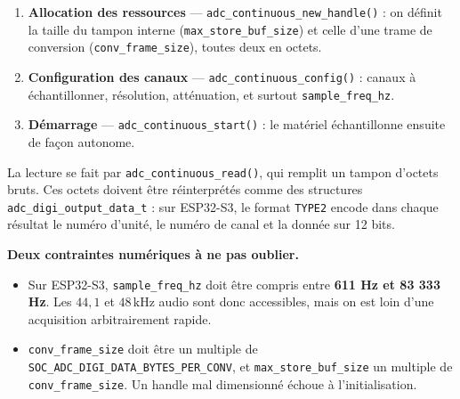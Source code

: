 \begin{enumerate}
    \item \textbf{Allocation des ressources} — \texttt{adc\_continuous\_new\_handle()} : on définit la taille du tampon interne (\texttt{max\_store\_buf\_size}) et celle d'une trame de conversion (\texttt{conv\_frame\_size}), toutes deux en octets.
    \item \textbf{Configuration des canaux} — \texttt{adc\_continuous\_config()} : canaux à échantillonner, résolution, atténuation, et surtout \texttt{sample\_freq\_hz}.
    \item \textbf{Démarrage} — \texttt{adc\_continuous\_start()} : le matériel échantillonne ensuite de façon autonome.
\end{enumerate}

La lecture se fait par \texttt{adc\_continuous\_read()}, qui remplit un tampon d'octets bruts. Ces octets doivent être réinterprétés comme des structures \texttt{adc\_digi\_output\_data\_t} : sur ESP32-S3, le format \texttt{TYPE2} encode dans chaque résultat le numéro d'unité, le numéro de canal et la donnée sur 12 bits.

\begin{imp}
\textbf{Deux contraintes numériques à ne pas oublier.}
\begin{itemize}
    \item Sur ESP32-S3, \texttt{sample\_freq\_hz} doit être compris entre \textbf{611 Hz et 83 333 Hz}. Les $44{,}1$ et $48\,\mathrm{kHz}$ audio sont donc accessibles, mais on est loin d'une acquisition arbitrairement rapide.
    \item \texttt{conv\_frame\_size} doit être un multiple de \texttt{SOC\_ADC\_DIGI\_DATA\_BYTES\_PER\_CONV}, et \texttt{max\_store\_buf\_size} un multiple de \texttt{conv\_frame\_size}. Un handle mal dimensionné échoue à l'initialisation.
\end{itemize}
\end{imp}


